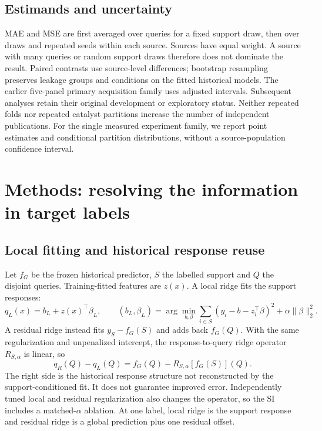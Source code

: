 \documentclass[11pt]{article}
\begin{document}
\subsection{Estimands and uncertainty}
MAE and MSE are first averaged over queries for a fixed support draw, then over draws and repeated seeds within each source. Sources have equal weight. A source with many queries or random support draws therefore does not dominate the result. Paired contrasts use source-level differences; bootstrap resampling preserves leakage groups and conditions on the fitted historical models. The earlier five-panel primary acquisition family uses adjusted intervals. Subsequent analyses retain their original development or exploratory status. Neither repeated folds nor repeated catalyst partitions increase the number of independent publications. For the single measured experiment family, we report point estimates and conditional partition distributions, without a source-population confidence interval.

\section{Methods: resolving the information in target labels}
\subsection{Local fitting and historical response reuse}
Let $f_G$ be the frozen historical predictor, $S$ the labelled support and $Q$ the disjoint queries. Training-fitted features are $z(x)$. A local ridge fits the support responses:
\begin{equation}
q_L(x)=b_L+z(x)^\top\beta_L,\qquad
(b_L,\beta_L)=\arg\min_{b,\beta}\sum_{i\in S}(y_i-b-z_i^\top\beta)^2+\alpha\|\beta\|_2^2.
\end{equation}
A residual ridge instead fits $y_S-f_G(S)$ and adds back $f_G(Q)$. With the same regularization and unpenalized intercept, the response-to-query ridge operator $R_{S,\alpha}$ is linear, so
\begin{equation}\label{eq:projection}
q_R(Q)-q_L(Q)=f_G(Q)-R_{S,\alpha}[f_G(S)](Q).
\end{equation}
The right side is the historical response structure not reconstructed by the support-conditioned fit. It does not guarantee improved error. Independently tuned local and residual regularization also changes the operator, so the SI includes a matched-$\alpha$ ablation. At one label, local ridge is the support response and residual ridge is a global prediction plus one residual offset.
\end{document}
